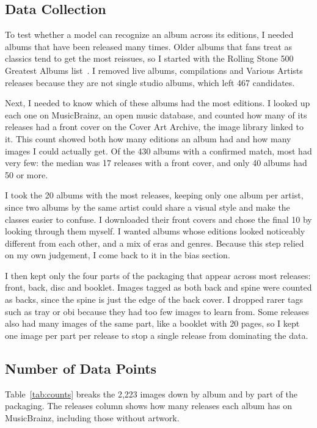 \documentclass[11pt,a4paper]{article}
\begin{document}
\subsection{Data Collection}
To test whether a model can recognize an album across its editions, I needed albums that have been released many times. Older albums that fans treat as classics tend to get the most reissues, so I started with the Rolling Stone 500 Greatest Albums list~\cite{rollingstone500}. I removed live albums, compilations and Various Artists releases because they are not single studio albums, which left 467 candidates.

Next, I needed to know which of these albums had the most editions. I looked up each one on MusicBrainz, an open music database, and counted how many of its releases had a front cover on the Cover Art Archive, the image library linked to it. This count showed both how many editions an album had and how many images I could actually get. Of the 430 albums with a confirmed match, most had very few: the median was 17 releases with a front cover, and only 40 albums had 50 or more.

I took the 20 albums with the most releases, keeping only one album per artist, since two albums by the same artist could share a visual style and make the classes easier to confuse. I downloaded their front covers and chose the final 10 by looking through them myself. I wanted albums whose editions looked noticeably different from each other, and a mix of eras and genres. Because this step relied on my own judgement, I come back to it in the bias section.

I then kept only the four parts of the packaging that appear across most releases: front, back, disc and booklet. Images tagged as both back and spine were counted as backs, since the spine is just the edge of the back cover. I dropped rarer tags such as tray or obi because they had too few images to learn from. Some releases also had many images of the same part, like a booklet with 20 pages, so I kept one image per part per release to stop a single release from dominating the data.

\subsection{Number of Data Points}
Table~\ref{tab:counts} breaks the 2,223 images down by album and by part of the packaging. The releases column shows how many releases each album has on MusicBrainz, including those without artwork.
\end{document}
